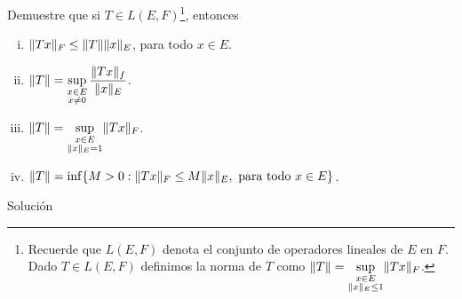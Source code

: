 \begin{homeworkProblem}
  Demuestre que si $T\in L(E,F)$\footnote{Recuerde que $L(E,F)$ denota el conjunto de operadores lineales de $E$ en $F$. Dado $T\in L(E,F)$ definimos la norma de $T$ como $\displaystyle \lVert T\rVert = \sup_{\substack{x \in E \\ \lVert x\rVert_E \leq 1}} \lVert Tx\rVert_F$.}, entonces
  \begin{enumerate}[(i)]
    \item $\lVert Tx\rVert_{F}\leq \lVert T\rVert\lVert x\rVert_{E}$, para todo $x\in E$.
    \item $\displaystyle \lVert T\rVert = \sup_{\substack{x \in E \\ x\neq 0}} \frac{\lVert Tx\rVert_{f}}{\lVert x\rVert_{E}}$.
    \item $\displaystyle \lVert T\rVert = \sup_{\substack{x \in E \\ \lVert x\rVert_E = 1}} \lVert Tx\rVert_F$.
    \item $\lVert T\rVert=\inf\{M>0:\lVert Tx\rVert_{F}\leq M\lVert x\rVert_{E}, \text{ para todo }x\in E\}$.
  \end{enumerate}
  \begin{solution}
    Solución
  \end{solution}
\end{homeworkProblem}

